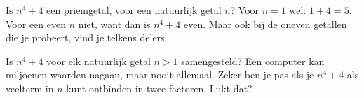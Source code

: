%


\begin{probleem}
Is $n^4 + 4$ een priemgetal, voor een natuurlijk getal $n$? Voor $n = 1$ wel: $1 + 4 = 5$. Voor een even $n$ niet, want dan is $n^4 + 4$ even. Maar ook bij de oneven getallen die je probeert, vind je telkens delers:


Is $n^4 + 4$ voor elk natuurlijk getal $n > 1$ samengesteld? Een computer kan miljoenen waarden nagaan, maar nooit allemaal. Zeker ben je pas als je $n^4 + 4$ als veelterm in $n$ kunt ontbinden in twee factoren. Lukt dat?
\end{probleem}


